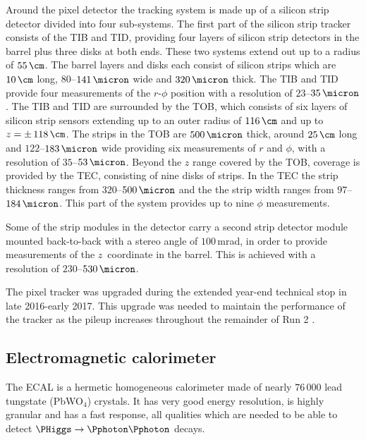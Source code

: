 Around the pixel detector the tracking system is made up of a silicon
strip detector divided into four sub-systems. The first part of the
silicon strip tracker consists of the \ac{TIB} and \ac{TID}, providing four layers of
silicon strip detectors in the barrel plus three disks at both ends. These two systems
extend out up to a radius of $55\,\cm$. The barrel layers and disks each consist
of silicon strips which are $10\,\cm$ long, $80$--$141\,\micron$ wide and $320\,\micron$ thick. The \ac{TIB} and \ac{TID}
provide four measurements of the $r$-$\phi$ position with a resolution of $23$--$35\,\micron$. 
The \ac{TIB} and \ac{TID} are surrounded by the \ac{TOB}, which consists of six layers of silicon strip sensors extending
up to an outer radius of $116\,\cm$ and up to $z=\pm\,118\,\cm$. The strips in the \ac{TOB} are $500\,\micron$ thick, 
around $25\,\cm$ long and $122$--$183\,\micron$ 
wide providing six measurements of $r$ and $\phi$, with a resolution
of $35$--$53\,\micron$. Beyond the $z$ range covered by the \ac{TOB}, coverage is provided by the \ac{TEC},
consisting of nine disks of strips. In the \ac{TEC} the strip thickness ranges from $320$--$500\,\micron$ and 
the the strip width ranges from $97$--$184\,\micron$. %
This part of the system provides up to nine $\phi$ measurements.

Some of the strip modules in the detector carry a second strip detector module mounted back-to-back with a stereo angle %
of $100\,$mrad, in order to provide measurements of the \mbox{$z$ coordinate} in the barrel. This is achieved with a resolution of $230$--$530\,\micron$.

The pixel tracker was upgraded during the extended year-end technical stop in late 2016-early 2017. This upgrade was needed to
maintain the performance of the tracker as the pileup increases throughout the remainder of Run 2 \cite{cms-pixel-upgrade}. %

\subsection{Electromagnetic calorimeter}
\label{sec:CMSLHC_CMS_ecal}
The \ac{ECAL} \cite{cms-jinst} is a hermetic homogeneous calorimeter
made of nearly $76\,000$ lead tungstate (PbWO$_4$) crystals. It has very
good energy resolution, is highly granular and has a fast response, all qualities 
which are needed to be able to detect $\PHiggs\rightarrow \Pphoton\Pphoton$ decays.

